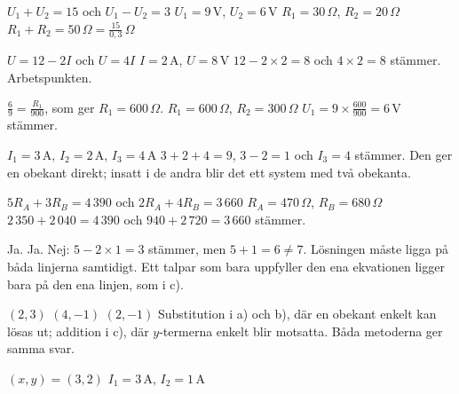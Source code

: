 \begin{facit}
  $U_1 + U_2 = 15$ och $U_1 - U_2 = 3$
 $U_1 = 9\,\text{V}$, $U_2 = 6\,\text{V}$
 $R_1 = 30\,\Omega$, $R_2 = 20\,\Omega$
 $R_1 + R_2 = 50\,\Omega = \frac{15}{0{,}3}\,\Omega$

  $U = 12 - 2I$ och $U = 4I$
 $I = 2\,\text{A}$, $U = 8\,\text{V}$
 $12 - 2 \times 2 = 8$ och $4 \times 2 = 8$ stämmer.
 Arbetspunkten.

  $\frac{6}{9} = \frac{R_1}{900}$, som ger $R_1 = 600\,\Omega$.
 $R_1 = 600\,\Omega$, $R_2 = 300\,\Omega$
 $U_1 = 9 \times \frac{600}{900} = 6\,\text{V}$ stämmer.

  $I_1 = 3\,\text{A}$, $I_2 = 2\,\text{A}$, $I_3 = 4\,\text{A}$
 $3 + 2 + 4 = 9$, $3 - 2 = 1$ och $I_3 = 4$ stämmer.
 Den ger en obekant direkt; insatt i de andra blir det ett system med två obekanta.

  $5R_A + 3R_B = 4\,390$ och $2R_A + 4R_B = 3\,660$
 $R_A = 470\,\Omega$, $R_B = 680\,\Omega$
 $2\,350 + 2\,040 = 4\,390$ och $940 + 2\,720 = 3\,660$ stämmer.

  Ja.  Ja.  Nej: $5 - 2 \times 1 = 3$ stämmer, men $5 + 1 = 6 \neq 7$.
 Lösningen måste ligga på båda linjerna samtidigt. Ett talpar som bara uppfyller den ena
ekvationen ligger bara på den ena linjen, som i c).

  $(2, 3)$  $(4, -1)$  $(2, -1)$
 Substitution i a) och b), där en obekant enkelt kan lösas ut; addition i c), där
$y$-termerna enkelt blir motsatta. Båda metoderna ger samma svar.

  $(x, y) = (3, 2)$
 $I_1 = 3\,\text{A}$, $I_2 = 1\,\text{A}$

\end{facit}
